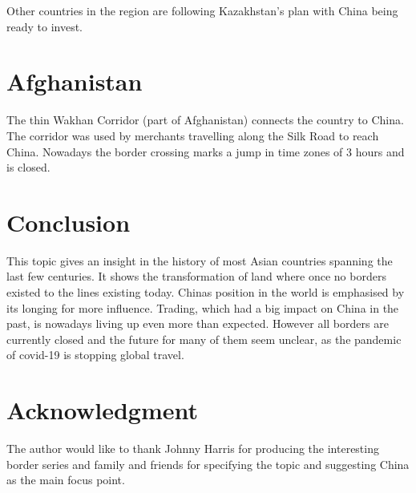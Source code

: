 \documentclass[conference]{IEEEtran}
\begin{document}
	Other countries in the region are following Kazakhstan's plan with China being ready to invest.
	
	\section{Afghanistan}
	The thin Wakhan Corridor (part of Afghanistan) connects the country to China. The corridor was used by merchants travelling along the Silk Road to reach China. Nowadays the border crossing marks a jump in time zones of 3 hours and is closed.
	
	\section{Conclusion}
	This topic gives an insight in the history of most Asian countries spanning the last few centuries. It shows the transformation of land where once no borders existed to the lines existing today. Chinas position in the world is emphasised by its longing for more influence. Trading, which had a big impact on China in the past, is nowadays living up even more than expected. However all borders are currently closed and the future for many of them seem unclear, as the pandemic of covid-19 is stopping global travel.
	
	\section*{Acknowledgment}
	The author would like to thank Johnny Harris for producing the interesting border series and family and friends for specifying the topic and suggesting China as the main focus point.
	
	
	
\end{document}
